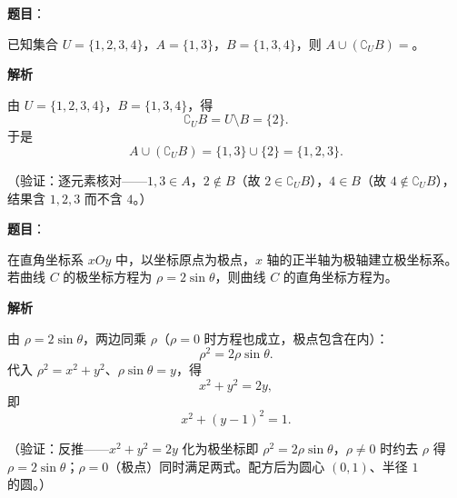 \begin{answer}

\textbf{题目}：

已知集合 \(U=\{1,2,3,4\}\)，\(A=\{1,3\}\)，\(B=\{1,3,4\}\)，则 \(A\cup(\complement_U B)=\)\gkblank{}。

\textbf{解析}

由 \(U=\{1,2,3,4\}\)，\(B=\{1,3,4\}\)，得
\nopagebreak[4]
\[
\complement_U B=U\setminus B=\{2\}.
\]
于是
\nopagebreak[4]
\[
A\cup(\complement_U B)=\{1,3\}\cup\{2\}=\{1,2,3\}.
\]

（验证：逐元素核对——\(1,3\in A\)，\(2\notin B\)（故 \(2\in\complement_U B\)），\(4\in B\)（故 \(4\notin\complement_U B\)），结果含 \(1,2,3\) 而不含 \(4\)。）


\end{answer}
\begin{answer}

\textbf{题目}：

在直角坐标系 \(xOy\) 中，以坐标原点为极点，\(x\) 轴的正半轴为极轴建立极坐标系。若曲线 \(C\) 的极坐标方程为 \(\rho=2\sin\theta\)，则曲线 \(C\) 的直角坐标方程为\gkblank{}。

\textbf{解析}

由 \(\rho=2\sin\theta\)，两边同乘 \(\rho\)（\(\rho=0\) 时方程也成立，极点包含在内）：
\nopagebreak[4]
\[
\rho^2=2\rho\sin\theta.
\]
代入 \(\rho^2=x^2+y^2\)、\(\rho\sin\theta=y\)，得
\nopagebreak[4]
\[
x^2+y^2=2y,
\]
即
\nopagebreak[4]
\[
x^2+(y-1)^2=1.
\]

（验证：反推——\(x^2+y^2=2y\) 化为极坐标即 \(\rho^2=2\rho\sin\theta\)，\(\rho\neq0\) 时约去 \(\rho\) 得 \(\rho=2\sin\theta\)；\(\rho=0\)（极点）同时满足两式。配方后为圆心 \((0,1)\)、半径 \(1\) 的圆。）


\end{answer}
